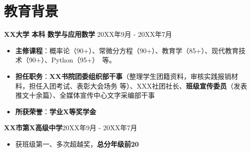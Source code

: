 	\section{\makebox[\widthof{\faGraduationCap}][c]{\color{WHU_Blue}{\faGraduationCap}}\quad 教育背景}
	{\large \textbf{XX大学}} \hspace{1.9cm} \textbf{本科} \hspace{1.5cm} \textbf{数学与应用数学} \hfill 20XX年9月 - 20XX年7月
	\begin{itemize}
		\item \textbf{主修课程}：概率论（90+）、常微分方程（90+）、教育学（85+）、现代教育技术（90+）、Python（95+）\ 等。
		\item \textbf{担任职务}：\textbf{XX书院团委组织部干事}（整理学生团籍资料，审核实践报销材料，担任入团考试、表彰大会场务 等）、XXX社团社长、\textbf{班级宣传委员}（发表推文十余篇）、全媒体宣传中心文字采编部干事
		\item \textbf{所获荣誉}：\textbf{学业X等奖学金}
	\end{itemize}
	\vspace{0.5em}
	{\large \textbf{XX市第X高级中学}}\hfill 20XX年9月 - 20XX年7月
	\begin{itemize}
		\item 获班级第一、多次超越奖，\textbf{总分年级前20}%
	\end{itemize}
	\vspace{-8pt}
